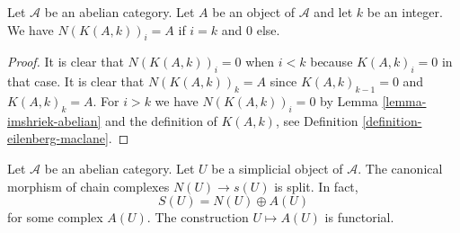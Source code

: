 \begin{lemma}
\label{lemma-N-K}
Let $\mathcal{A}$ be an abelian category.
Let $A$ be an object of $\mathcal{A}$ and
let $k$ be an integer. We have
$N(K(A, k))_i = A$ if $i = k$ and
$0$ else.
\end{lemma}

\begin{proof}
It is clear that $N(K(A, k))_i = 0$ when $i < k$
because $K(A, k)_i = 0$ in that case.
It is clear that $N(K(A, k))_k = A$ since
$K(A, k)_{k - 1} = 0$ and $K(A, k)_k = A$.
For $i > k$ we have $N(K(A, k))_i = 0$
by Lemma \ref{lemma-imshriek-abelian} and
the definition of $K(A, k)$, see Definition
\ref{definition-eilenberg-maclane}.
\end{proof}

\begin{lemma}
\label{lemma-decompose-associated-complexes}
Let $\mathcal{A}$ be an abelian category.
Let $U$ be a simplicial object of $\mathcal{A}$.
The canonical morphism of chain complexes
$N(U) \to s(U)$ is split. In fact,
$$
S(U) = N(U) \oplus A(U)
$$
for some complex $A(U)$. The construction $U \mapsto A(U)$
is functorial.
\end{lemma}

